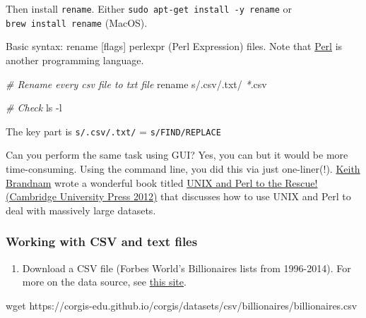 \documentclass[
]{book}
\newenvironment{Shaded}{\begin{snugshade}}{\end{snugshade}}
\newcommand{\AttributeTok}[1]{\textcolor[rgb]{0.77,0.63,0.00}{#1}}
\newcommand{\CommentTok}[1]{\textcolor[rgb]{0.56,0.35,0.01}{\textit{#1}}}
\newcommand{\ExtensionTok}[1]{#1}
\newcommand{\FunctionTok}[1]{\textcolor[rgb]{0.00,0.00,0.00}{#1}}
\newcommand{\NormalTok}[1]{#1}
\newcommand{\PreprocessorTok}[1]{\textcolor[rgb]{0.56,0.35,0.01}{\textit{#1}}}
\newcommand{\StringTok}[1]{\textcolor[rgb]{0.31,0.60,0.02}{#1}}
\providecommand{\tightlist}{%
  \setlength{\itemsep}{0pt}\setlength{\parskip}{0pt}}
\begin{document}
Then install \texttt{rename}. Either \texttt{sudo\ apt-get\ install\ -y\ rename} or \texttt{brew\ install\ rename} (MacOS).

Basic syntax: rename {[}flags{]} perlexpr (Perl Expression) files. Note that \href{https://en.wikipedia.org/wiki/Perl}{Perl} is another programming language.

\begin{Shaded}
\begin{Highlighting}[]
\CommentTok{\# Rename every csv file to txt file }
\ExtensionTok{rename} \StringTok{\textquotesingle{}s/.csv/.txt/\textquotesingle{}} \PreprocessorTok{*}\NormalTok{.csv}

\CommentTok{\# Check }
\FunctionTok{ls} \AttributeTok{{-}l}
\end{Highlighting}
\end{Shaded}

The key part is \texttt{s/.csv/.txt/} = \texttt{s/FIND/REPLACE}

Can you perform the same task using GUI? Yes, you can but it would be more time-consuming. Using the command line, you did this via just one-liner(!). \href{http://korflab.ucdavis.edu/Bios/bio_keithb.html}{Keith Brandnam} wrote a wonderful book titled \href{https://www.amazon.com/Unix-Perl-Rescue-Keith-Bradnam/dp/0521169828}{UNIX and Perl to the Rescue! (Cambridge University Press 2012)} that discusses how to use UNIX and Perl to deal with massively large datasets.

\hypertarget{working-with-csv-and-text-files}{%
\subsubsection{Working with CSV and text files}\label{working-with-csv-and-text-files}}

\begin{enumerate}
\def\labelenumi{\arabic{enumi}.}
\tightlist
\item
  Download a CSV file (Forbes World's Billionaires lists from 1996-2014). For more on the data source, see \href{https://corgis-edu.github.io/corgis/csv/billionaires/}{this site}.
\end{enumerate}

\begin{Shaded}
\begin{Highlighting}[]
\FunctionTok{wget}\NormalTok{ https://corgis{-}edu.github.io/corgis/datasets/csv/billionaires/billionaires.csv}
\end{Highlighting}
\end{Shaded}
\end{document}

